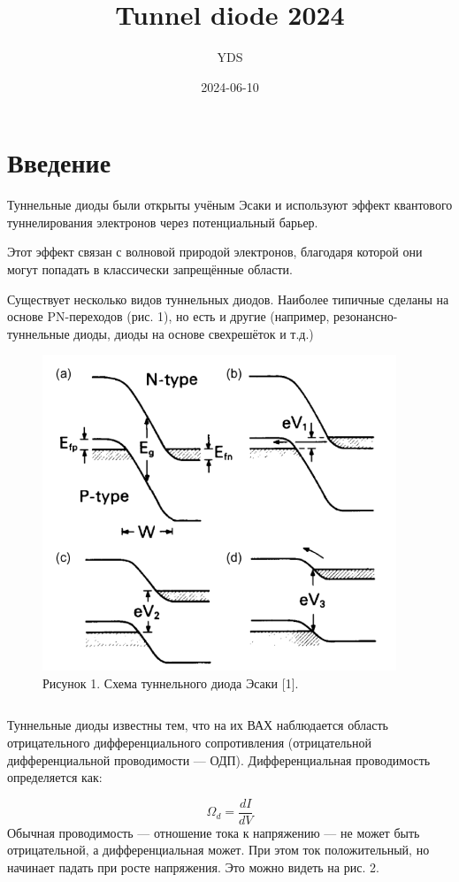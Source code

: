 \documentclass[
]{article}
\title{Tunnel diode 2024}
\author{YDS}
\date{2024-06-10}
\begin{document}
\maketitle

\section{Введение}\label{ux432ux432ux435ux434ux435ux43dux438ux435}

Туннельные диоды были открыты учёным Эсаки и используют эффект
квантового туннелирования электронов через потенциальный барьер.

Этот эффект связан с волновой природой электронов, благодаря которой они
могут попадать в классически запрещённые области.

Существует несколько видов туннельных диодов. Наиболее типичные сделаны
на основе PN-переходов (рис. 1), но есть и другие (например,
резонансно-туннельные диоды, диоды на основе свехрешёток и т.д.)

\begin{figure}
\centering
\includegraphics[width=4.16667in,height=\textheight]{images/esaki.png}
\caption{Рисунок 1. Схема туннельного диода Эсаки {[}1{]}.}
\end{figure}

\[ \]

Туннельные диоды известны тем, что на их ВАХ наблюдается область
отрицательного дифференциального сопротивления (отрицательной
дифференциальной проводимости --- ОДП). Дифференциальная проводимость
определяется как:

\[ \Omega_{d}=\frac{dI}{dV} \] Обычная проводимость --- отношение тока к
напряжению --- не может быть отрицательной, а дифференциальная может.
При этом ток положительный, но начинает падать при росте напряжения. Это
можно видеть на рис. 2.
\end{document}
